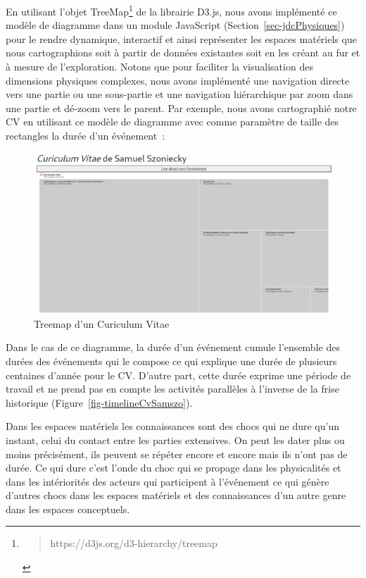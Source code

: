 \documentclass[
  letterpaper,
  DIV=11,
  numbers=noendperiod]{scrreprt}
\begin{document}
En utilisant l'objet TreeMap\footnote{\begin{quote}
  https://d3js.org/d3-hierarchy/treemap
  \end{quote}} de la librairie D3.js, nous avons implémenté ce modèle de
diagramme dans un module JavaScript (Section~\ref{sec-jdcPhysiques})
pour le rendre dynamique, interactif et ainsi représenter les espaces
matériels que nous cartographions soit à partir de données existantes
soit en les créant au fur et à mesure de l'exploration. Notons que pour
faciliter la visualisation des dimensions physiques complexes, nous
avons implémenté une navigation directe vers une partie ou une
sous-partie et une navigation hiérarchique par zoom dans une partie et
dé-zoom vers le parent. Par exemple, nous avons cartographié notre CV en
utilisant ce modèle de diagramme avec comme paramètre de taille des
rectangles la durée d'un événement~:

\begin{figure}

{\centering \includegraphics{media/1000000100000521000002C4F34D431EF036AFFE.png}

}

\caption{\label{fig-treeMapCv}Treemap d'un Curiculum Vitae}

\end{figure}

Dans le cas de ce diagramme, la durée d'un événement cumule l'ensemble
des durées des événements qui le compose ce qui explique une durée de
plusieurs centaines d'année pour le CV. D'autre part, cette durée
exprime une période de travail et ne prend pas en compte les activités
parallèles à l'inverse de la frise historique
(Figure~\ref{fig-timelineCvSamszo}).

Dans les espaces matériels les connaissances sont des chocs qui ne dure
qu'un instant, celui du contact entre les parties extensives. On peut
les dater plus ou moins précisément, ils peuvent se répéter encore et
encore mais ils n'ont pas de durée. Ce qui dure c'est l'onde du choc qui
se propage dans les physicalités et dans les intériorités des acteurs
qui participent à l'événement ce qui génère d'autres chocs dans les
espaces matériels et des connaissances d'un autre genre dans les espaces
conceptuels.
\end{document}
